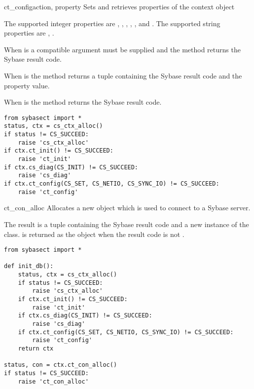 \begin{methoddesc}[CS_CONTEXT]{ct_config}{action, property }
Sets and retrieves properties of the context object

The supported integer properties are ,
, , ,
, and .  The supported string
properties are , .

When  is  a compatible  argument
must be supplied and the method returns the Sybase result code.

When  is  the method returns a tuple
containing the Sybase result code and the property value.

When  is  the method returns the Sybase
result code.

\begin{verbatim}
from sybasect import *
status, ctx = cs_ctx_alloc()
if status != CS_SUCCEED:
    raise 'cs_ctx_alloc'
if ctx.ct_init() != CS_SUCCEED:
    raise 'ct_init'
if ctx.cs_diag(CS_INIT) != CS_SUCCEED:
    raise 'cs_diag'
if ctx.ct_config(CS_SET, CS_NETIO, CS_SYNC_IO) != CS_SUCCEED:
    raise 'ct_config'
\end{verbatim}
\end{methoddesc}

\begin{methoddesc}[CS_CONTEXT]{ct_con_alloc}{}
Allocates a new  object which is used to connect
to a Sybase server.

The result is a tuple containing the Sybase result code and a new
instance of the  class.  is returned
as the  object when the result code is not
.

\begin{verbatim}
from sybasect import *

def init_db():
    status, ctx = cs_ctx_alloc()
    if status != CS_SUCCEED:
    	raise 'cs_ctx_alloc'
    if ctx.ct_init() != CS_SUCCEED:
    	raise 'ct_init'
    if ctx.cs_diag(CS_INIT) != CS_SUCCEED:
    	raise 'cs_diag'
    if ctx.ct_config(CS_SET, CS_NETIO, CS_SYNC_IO) != CS_SUCCEED:
    	raise 'ct_config'
    return ctx

status, con = ctx.ct_con_alloc()
if status != CS_SUCCEED:
    raise 'ct_con_alloc'
\end{verbatim}
\end{methoddesc}

